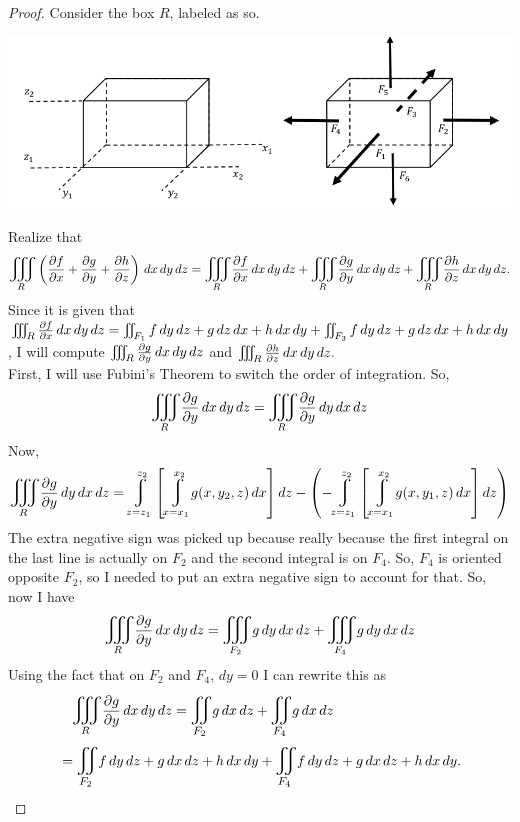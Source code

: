 \documentclass[titlepage]{article}
\begin{document}
\begin{proof}
Consider the box $R$, labeled as so. \\
\begin{center} \includegraphics[scale=.5]{boxes}\end{center}
Realize that 
$$ \mathlarger\iiint_{R}\left( \frac{\p f}{\p x} + \frac{\p g}{\p y} + \frac{\p h}{\p z} \right)\,dx\,dy\,dz = \mathlarger\iiint_{R}  \frac{\p f}{\p x}\,dx\,dy\,dz  + \mathlarger\iiint_{R}  \frac{\p g}{\p y}\,dx\,dy\,dz + \mathlarger\iiint_{R} \frac{\p h}{\p z} \,dx\,dy\,dz.$$
Since it is given that $\iiint_{R}  \frac{\partial f}{\partial x}\,dx\,dy\,dz = \iint_{F_1} f\,dy\,dz + g\,dz\,dx + h\,dx\,dy +  \iint_{F_3} f\,dy\,dz + g\,dz\,dx + h\,dx\,dy$, I will compute $\iiint_{R}  \frac{\partial g}{\partial y}\,dx\,dy\,dz$ and $\iiint_{R} \frac{\partial h}{\partial z} \,dx\,dy\,dz.$ \\
First, I will use Fubini's Theorem to switch the order of integration. So,
$$ \mathlarger\iiint_{R}  \frac{\p g}{\p y}\,dx\,dy\,dz = \mathlarger\iiint_{R}  \frac{\p g}{\p y}\,dy\,dx\,dz$$
Now,
$$ \mathlarger\iiint_{R}  \frac{\p g}{\p y}\,dy\,dx\,dz = \mlvarint\limits_{z=z_1}^{z_2}\left[\mlvarint\limits_{x=x_1}^{x_2} g(x,y_2,z)\,dx\right]dz - \left(- \mlvarint\limits_{z=z_1}^{z_2}\left[\mlvarint\limits_{x=x_1}^{x_2} g(x,y_1,z)\,dx\right]dz\right)$$
The extra negative sign was picked up because really because the first integral on the last line is actually on $F_2$ and the second integral is on $F_4$. So, $F_4$ is oriented opposite $F_2$, so I needed to put an extra negative sign to account for that. So, now I have
$$\mathlarger\iiint_{R}  \frac{\p g}{\p y}\,dx\,dy\,dz = \mathlarger\iiint_{F_2}  g \,dy\,dx\,dz + \mathlarger\iiint_{F_4}  g \,dy\,dx\,dz$$
Using the fact that on $F_2$ and $F_4$, $dy = 0$ I can rewrite this as 
\begin{align*}& \quad \mathlarger\iiint_{R}  \frac{\p g}{\p y}\,dx\,dy\,dz = \bigiint{F_2}{}  g \,dx\,dz + \bigiint{F_4}{}  g\,dx\,dz\\
&= \bigiint{F_2}{} f \,dy\,dz + g \,dx\,dz + h\,dx\,dy + \bigiint{F_4}{} f \,dy\,dz + g \,dx\,dz + h\,dx\,dy.

\end{align*}
\end{proof}
\end{document}
